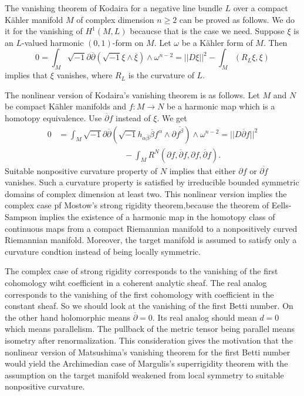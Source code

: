 The vanishing theorem of Kodaira for a negative line bundle $L$ over a compact K\"ahler manifold $M$ of complex dimension $n \geq 2$ can be proved as follows. We do it for the vanishing of $H^{1}(M, L)$ becaucse that is the case we need. Suppose $\xi$ is an $L$-valued harmonic $(0,1)$-form on $M$. Let $\omega$ be a K\"ahler form of $M$. Then
$$
0=\int_{M}\sqrt{-1}\partial \overline{\partial}(\sqrt{-1}\xi \wedge \overline{\xi})\wedge \omega^{n-2} = ||D\xi||^{2}- \int_{M}(R_{L}\xi, \xi)
$$
implies that $\xi$ vanishes, where $R_{L}$ is the curvature of $L$.

The nonlinear version of Kodaira's vanishing theorem is as follows. Let $M$ and $N$ be compact K\"ahler manifolds and $f: M \rightarrow N$ be a harmonic map which is a homotopy equivalence. Use $\overline{\partial}f$ instead of $\xi$. We get
\begin{equation*}
\begin{split}
0 &=\int_{M}\sqrt{-1}\partial \overline{\partial}(\sqrt{-1}h_{\alpha \overline{\beta}}\overline{\beta}f^{\alpha}\wedge \partial\overline{f^{\beta}})\wedge \omega^{n-2} = ||D\overline{\partial}f||^{2}\\
&\qquad \qquad \qquad \qquad -\int_{M}R^{N}(\partial f, \overline{\partial}f, \partial f, \overline{\partial}f).
\end{split}
\end{equation*}
Suitable nonpositive curvature property of $N$ implies that either $\partial f$ or $\overline{\partial f}$ vanishes. Such a curvature property is satisfied by irreducible bounded symmetric domains of complex dimension at least two. This nonlinear version implies the complex case pf Mostow's strong rigidity theorem,because the theorem of Eells-Sampson implies the existence of a harmonic map in the homotopy class of continuous maps from a compact Riemannian manifold to a nonpositively curved Riemannian manifold. Moreover, the target manifold is assumed to satisfy only a curvature condtion instead of being locally symmetric.

The complex case of strong rigidity corresponds to the vanishing of the first cohomology wiht coefficient in a coherent analytic sheaf. The real analog corresponds to the vanishing of the first cohomology with coefficient in the constant sheaf. So we should look at the vanishing of the first Betti number. On the other hand holomorphic means $\overline{\partial} = 0$. Its real analog should mean $d=0$ which means parallelism. The pullback of the metric tensor being parallel means isometry after renormalization. This consideration gives the motivation that the nonlinear version of Matsushima's vanishing theorem for the first Betti number would yield the Archimedian case of Margulis's superrigidity theorem with the assumption on the target manifold weakened from local symmetry to suitable nonpositive curvature.

